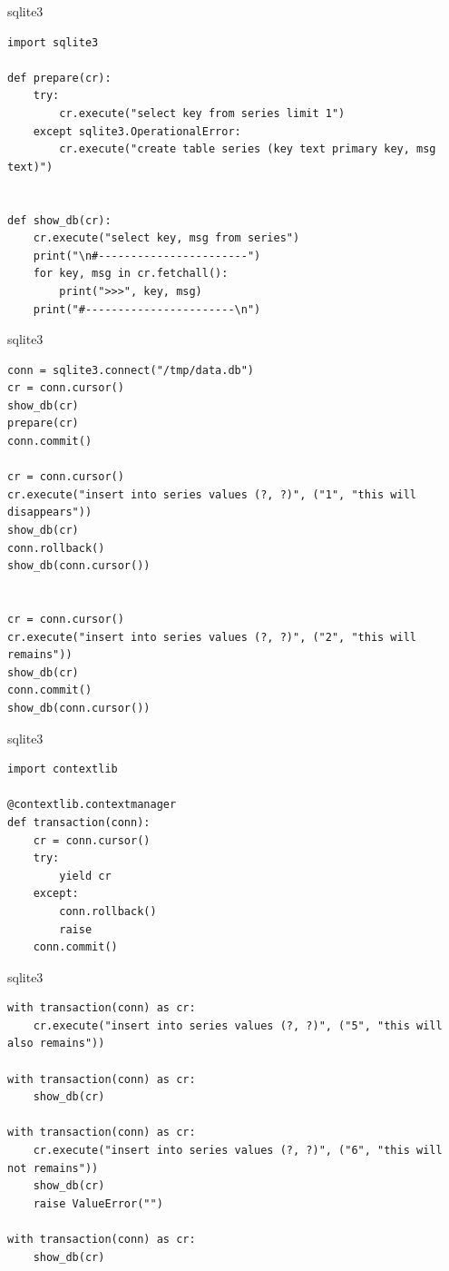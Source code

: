\documentclass{article}
\begin{document}
\begin{center} sqlite3 \end{center}
\begin{lstlisting}
import sqlite3

def prepare(cr):
    try:
        cr.execute("select key from series limit 1")
    except sqlite3.OperationalError:
        cr.execute("create table series (key text primary key, msg text)")


def show_db(cr):
    cr.execute("select key, msg from series")
    print("\n#-----------------------")
    for key, msg in cr.fetchall():
        print(">>>", key, msg)
    print("#-----------------------\n")
\end{lstlisting}
\newpage

\begin{center} sqlite3 \end{center}
\begin{lstlisting}
conn = sqlite3.connect("/tmp/data.db")
cr = conn.cursor()
show_db(cr)
prepare(cr)
conn.commit()

cr = conn.cursor()
cr.execute("insert into series values (?, ?)", ("1", "this will disappears"))
show_db(cr)
conn.rollback()
show_db(conn.cursor())


cr = conn.cursor()
cr.execute("insert into series values (?, ?)", ("2", "this will remains"))
show_db(cr)
conn.commit()
show_db(conn.cursor())
\end{lstlisting}
\newpage

\begin{center} sqlite3 \end{center}
\begin{lstlisting}
import contextlib

@contextlib.contextmanager
def transaction(conn):
    cr = conn.cursor()
    try:
        yield cr
    except:
        conn.rollback()
        raise
    conn.commit()
\end{lstlisting}
\newpage


\begin{center} sqlite3 \end{center}
\begin{lstlisting}
with transaction(conn) as cr:
    cr.execute("insert into series values (?, ?)", ("5", "this will also remains"))

with transaction(conn) as cr:
    show_db(cr)

with transaction(conn) as cr:
    cr.execute("insert into series values (?, ?)", ("6", "this will not remains"))
    show_db(cr)
    raise ValueError("")

with transaction(conn) as cr:
    show_db(cr)
\end{lstlisting}
\newpage
\end{document}
